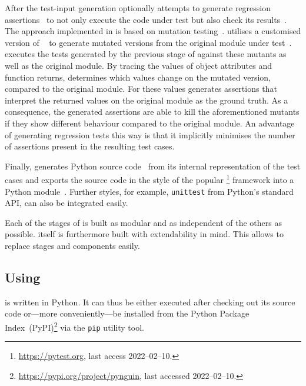 After the test-input generation
\pynguin optionally attempts to generate regression assertions~\cite{Xie06}
to not only execute the code under test
but also check its results~.
%
The approach implemented in \pynguin is based on mutation testing~\cite{FZ12}.
%
\Pynguin utilises a customised version of \MutPy~\cite{DH14}
to generate mutated versions from the original module under test~.
%
\MutPy executes the tests generated by the previous stage of \pynguin
against these mutants as well as the original module.
%
By tracing the values of object attributes and function returns,
\pynguin determines which values change on the mutated version,
compared to the original module.
%
For these values \pynguin generates assertions
that interpret the returned values on the original module
as the ground truth.
%
As a consequence,
the generated assertions are able to kill the aforementioned mutants
if they show different behaviour
compared to the original module.
%
An advantage of generating regression tests this way is
that it implicitly minimises the number of assertions
present in the resulting test cases.
%

%
Finally, \pynguin generates Python source code~
from its internal representation of the test cases
and exports the source code
in the style of the popular
\footnote{%
  \url{https://pytest.org}, last access 2022–02–10.%
} framework into a Python module~.
%
Further styles,
for example,
\texttt{unittest} from Python's standard API,
can also be integrated easily.
%

Each of the stages of \pynguin
is built as modular and as independent of the others
as possible.
%
\Pynguin itself is furthermore built with extendability in mind.
%
This allows to replace stages and components easily.
%


\subsection{Using \pynguin}\label{sec:approach-usage}

\Pynguin is written in Python.
%
It can thus be either executed after checking out its source code
or—more conveniently—be installed
from the Python Package Index~(PyPI)\footnote{%
  \url{https://pypi.org/project/pynguin}, last accessed 2022–02–10.%
} via the \texttt{pip} utility tool.
%

